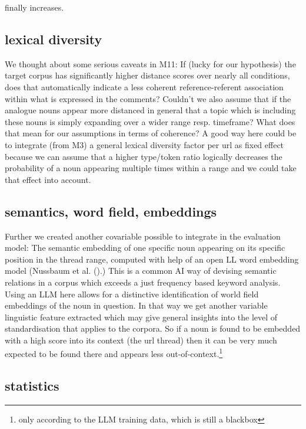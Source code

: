 \documentclass[
  12pt,
  oneside]{book}
\begin{document}
finally increases.

\subsection{lexical diversity}\label{lexical-diversity}

We thought about some serious caveats in M11: If (lucky for our hypothesis) the target corpus has significantly higher distance scores over nearly all conditions, does that automatically indicate a less coherent reference-referent association within what is expressed in the comments? Couldn't we also assume that if the analogue nouns appear more distanced in general that a topic which is including these nouns is simply expanding over a wider range resp. timeframe? What does that mean for our assumptions in terms of coherence? A good way here could be to integrate (from M3) a general lexical diversity factor per url as fixed effect because we can assume that a higher type/token ratio logically decreases the probability of a noun appearing multiple times within a range and we could take that effect into account.

\subsection{semantics, word field, embeddings}\label{semantics-word-field-embeddings}

Further we created another covariable possible to integrate in the evaluation model: The semantic embedding of one specific noun appearing on its specific position in the thread range, computed with help of an open LL word embedding model (Nussbaum et al. ().) This is a common AI way of devising semantic relations in a corpus which exceeds a just frequency based keyword analysis. Using an LLM here allows for a distinctive identification of world field embeddings of the noun in question. In that way we get another variable linguistic feature extracted which may give general insights into the level of standardisation that applies to the corpora. So if a noun is found to be embedded with a high score into its context (the url thread) then it can be very much expected to be found there and appears less out-of-context.\footnote{only according to the LLM training data, which is still a blackbox}

\subsection{statistics}\label{statistics}
\end{document}
